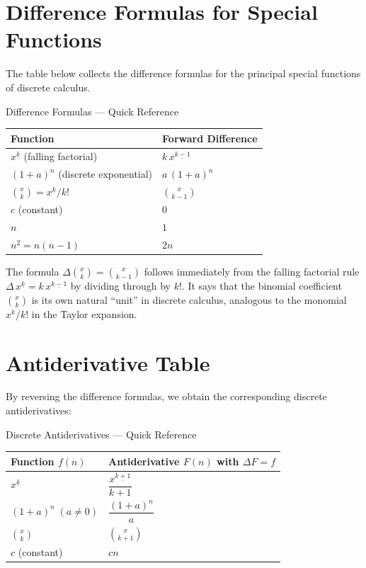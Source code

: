 
\section*{Difference Formulas for Special Functions}

The table below collects the difference formulas for the principal
special functions of discrete calculus.

\begin{toolkitbox}{Difference Formulas — Quick Reference}
\renewcommand{\arraystretch}{1.7}
\begin{tabular}{@{}l l@{}}
\textbf{Function} & \textbf{Forward Difference} \\
\hline
$x^{\underline{k}}$ (falling factorial) & $k\,x^{\underline{k-1}}$ \\
$(1+a)^n$ (discrete exponential) & $a\,(1+a)^n$ \\
$\binom{x}{k} = x^{\underline{k}}/k!$ & $\binom{x}{k-1}$ \\
$c$ (constant) & $0$ \\
$n$ & $1$ \\
$n^{\underline{2}} = n(n-1)$ & $2n$ \\
\end{tabular}
\end{toolkitbox}

\begin{remark*}
The formula \(\Delta\binom{x}{k} = \binom{x}{k-1}\) follows immediately
from the falling factorial rule \(\Delta\,x^{\underline{k}} = k\,x^{\underline{k-1}}\)
by dividing through by \(k!\). It says that the binomial coefficient
\(\binom{x}{k}\) is its own natural ``unit'' in discrete calculus, analogous
to the monomial \(x^k/k!\) in the Taylor expansion.
\end{remark*}

\section*{Antiderivative Table}

By reversing the difference formulas, we obtain the corresponding
discrete antiderivatives:

\begin{toolkitbox}{Discrete Antiderivatives — Quick Reference}
\renewcommand{\arraystretch}{1.7}
\begin{tabular}{@{}l l@{}}
\textbf{Function \(f(n)\)} & \textbf{Antiderivative \(F(n)\) with \(\Delta F = f\)} \\
\hline
$x^{\underline{k}}$ & $\dfrac{x^{\underline{k+1}}}{k+1}$ \\[6pt]
$(1+a)^n\;(a\ne 0)$ & $\dfrac{(1+a)^n}{a}$ \\[6pt]
$\binom{x}{k}$ & $\binom{x}{k+1}$ \\[6pt]
$c$ (constant) & $cn$ \\
\end{tabular}
\end{toolkitbox}

